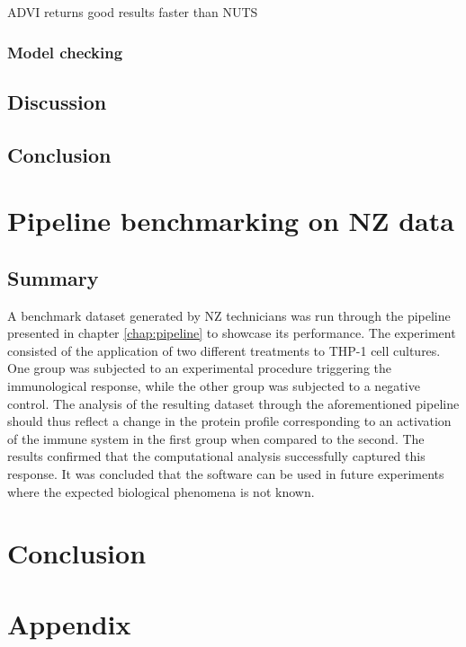 \documentclass[11pt, a4paper]{report}
\begin{document}
\ac{ADVI} returns good results faster than \ac{NUTS}

\subsection{Model checking}


\section{Discussion}



\section{Conclusion}





\chapter{Pipeline benchmarking on \ac{NZ} data}
\label{chap:benchmark}

\section*{Summary}

A benchmark dataset generated by \ac{NZ} technicians was run through the pipeline presented in chapter \ref{chap:pipeline} to showcase its performance. The experiment consisted of the application of two different treatments to THP-1 cell cultures. One group was subjected to an experimental procedure triggering the immunological response, while the other group was subjected to a negative control. The analysis of the resulting dataset through the aforementioned pipeline should thus reflect a change in the protein profile corresponding to an activation of the immune system in the first group when compared to the second. The results confirmed that the computational analysis successfully captured this response. It was concluded that the software can be used in future experiments where the expected biological phenomena is not known.



\chapter*{Conclusion}
\label{chap:conclusion}

\chapter*{Appendix}
\label{chap:appendix}





\footnotesize{}
\end{document}
